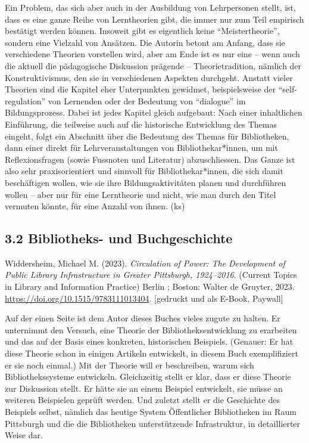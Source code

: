 \documentclass[a4paper,
fontsize=11pt,
oneside,
numbers=noperiodatend,
parskip=half-,
bibliography=totoc,
final
]{scrartcl}
\begin{document}
Ein Problem, das sich aber auch in der Ausbildung von Lehrpersonen
stellt, ist, dass es eine ganze Reihe von Lerntheorien gibt, die immer
nur zum Teil empirisch bestätigt werden können. Insoweit gibt es
eigentlich keine \enquote{Meistertheorie}, sondern eine Vielzahl von
Ansätzen. Die Autorin betont am Anfang, dass sie verschiedene Theorien
vorstellen wird, aber am Ende ist es nur eine -- wenn auch die aktuell
die pädagogische Diskussion prägende -- Theorietradition, nämlich der
Konstruktivismus, den sie in verschiedenen Aspekten durchgeht. Anstatt
vieler Theorien sind die Kapitel eher Unterpunkten gewidmet,
beispielsweise der \enquote{self-regulation} von Lernenden oder der
Bedeutung von \enquote{dialogue} im Bildungsprozess. Dabei ist jedes
Kapitel gleich aufgebaut: Nach einer inhaltlichen Einführung, die
teilweise auch auf die historische Entwicklung des Themas eingeht, folgt
ein Abschnitt über die Bedeutung des Themas für Bibliotheken, dann einer
direkt für Lehrveranstaltungen von Bibliothekar*innen, um mit
Reflexionsfragen (sowie Fussnoten und Literatur) abzuschliessen. Das
Ganze ist also sehr praxisorientiert und sinnvoll für
Bibliothekar*innen, die sich damit beschäftigen wollen, wie sie ihre
Bildungsaktivitäten planen und durchführen wollen -- aber nur für eine
Lerntheorie und nicht, wie man durch den Titel vermuten könnte, für eine
Anzahl von ihnen. (ks)

\hypertarget{bibliotheks--und-buchgeschichte}{%
\subsection{3.2 Bibliotheks- und
Buchgeschichte}\label{bibliotheks--und-buchgeschichte}}

Widdersheim, Michael M. (2023). \emph{Circulation of Power: The
Development of Public Library Infrastructure in Greater Pittsburgh,
1924--2016}. (Current Topics in Library and Information Practice) Berlin
; Boston: Walter de Gruyter, 2023.
\url{https://doi.org/10.1515/9783111013404}. {[}gedruckt und als E-Book,
Paywall{]}

Auf der einen Seite ist dem Autor dieses Buches vieles zugute zu halten.
Er unternimmt den Versuch, eine Theorie der Bibliotheksentwicklung zu
erarbeiten und das auf der Basis eines konkreten, historischen
Beispiels. (Genauer: Er hat diese Theorie schon in einigen Artikeln
entwickelt, in diesem Buch exemplifiziert er sie noch einmal.) Mit der
Theorie will er beschreiben, warum sich Bibliothekssysteme entwickeln.
Gleichzeitig stellt er klar, dass er diese Theorie zur Diskussion
stellt. Er hätte sie an einem Beispiel entwickelt, sie müsse an weiteren
Beispielen geprüft werden. Und zuletzt stellt er die Geschichte des
Beispiels selbst, nämlich das heutige System Öffentlicher Bibliotheken
im Raum Pittsburgh und die die Bibliotheken unterstützende
Infrastruktur, in detaillierter Weise dar.
\end{document}
